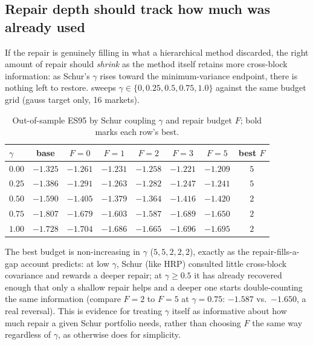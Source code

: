 \documentclass[11pt]{article}
\begin{document}
\subsection{Repair depth should track how much was already used}
\label{sec:gamma-result}

If the repair is genuinely filling in what a hierarchical method discarded,
the right amount of repair should \emph{shrink} as the method itself
retains more cross-block information: as Schur's $\gamma$ rises toward the
minimum-variance endpoint, there is nothing left to restore.
 sweeps $\gamma\in\{0,0.25,0.5,0.75,1.0\}$ against the same
budget grid (gauss target only, 16 markets).

\begin{table}[h]
\centering
\caption{Out-of-sample ES95 by Schur coupling $\gamma$ and repair budget $F$; bold marks each row's best.}
\label{tab:gamma}
\footnotesize
\begin{tabular}{lccccccc}
\toprule
$\gamma$ & base & $F=0$ & $F=1$ & $F=2$ & $F=3$ & $F=5$ & best $F$ \\
\midrule
$0.00$ & $-1.325$ & $-1.261$ & $-1.231$ & $-1.258$ & $-1.221$ & $\mathbf{-1.209}$ & $5$ \\
$0.25$ & $-1.386$ & $-1.291$ & $-1.263$ & $-1.282$ & $-1.247$ & $\mathbf{-1.241}$ & $5$ \\
$0.50$ & $-1.590$ & $-1.405$ & $-1.379$ & $\mathbf{-1.364}$ & $-1.416$ & $-1.420$ & $2$ \\
$0.75$ & $-1.807$ & $-1.679$ & $-1.603$ & $\mathbf{-1.587}$ & $-1.689$ & $-1.650$ & $2$ \\
$1.00$ & $-1.728$ & $-1.704$ & $-1.686$ & $\mathbf{-1.665}$ & $-1.696$ & $-1.695$ & $2$ \\
\bottomrule
\end{tabular}
\end{table}

The best budget is non-increasing in $\gamma$ ($5,5,2,2,2$), exactly as the
repair-fills-a-gap account predicts: at low $\gamma$, Schur (like HRP)
consulted little cross-block covariance and rewards a deeper repair; at
$\gamma\ge0.5$ it has already recovered enough that only a shallow repair
helps and a deeper one starts double-counting the same information (compare
$F=2$ to $F=5$ at $\gamma=0.75$: $-1.587$ vs.\ $-1.650$, a real reversal).
This is evidence for treating $\gamma$ itself as informative about how much
repair a given Schur portfolio needs, rather than choosing $F$ the same way
regardless of $\gamma$, as  otherwise does for
simplicity.
\end{document}
